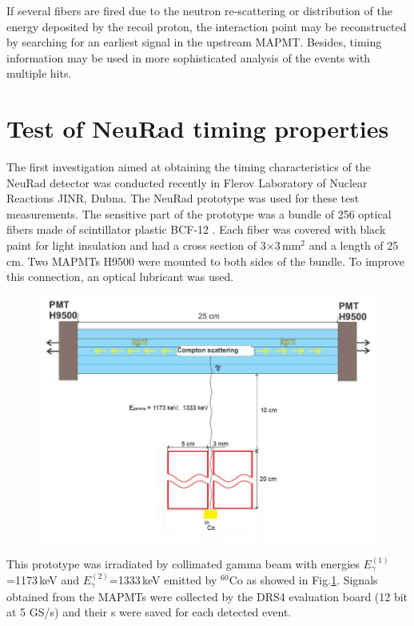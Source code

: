 \documentclass{webofc}
\begin{document}
If several  fibers are fired due to the neutron re-scattering or distribution of the energy deposited by the recoil proton, the interaction point may be reconstructed by searching for an earliest signal in the upstream MAPMT. Besides, timing information may be used in more sophisticated analysis of the events with multiple hits.

\section{Test of NeuRad timing properties}

The first investigation aimed at obtaining the timing characteristics of the NeuRad detector was conducted recently in Flerov Laboratory of Nuclear Reactions JINR, Dubna. The NeuRad prototype was used for these test measurements. The sensitive part of the prototype was a bundle of 256 optical fibers made of scintillator plastic BCF-12 \cite{crystals}. 
Each fiber was covered with black paint for light insulation and had a cross section of 3$\times$3\,mm$^2$ and a length of 25\,cm. Two MAPMTs H9500 \cite{hm} were mounted to both sides of the bundle. To improve this connection, an optical lubricant was used.

\begin{figure}[h]
	\centering
	\includegraphics[width=0.7\linewidth]{NeuRadexperiment.png}
	\label{ris:neuradexp}
\end{figure}

This prototype was irradiated by collimated gamma beam with energies $E^{(1)}_{\gamma}$=1173\,keV and $E^{(2)}_{\gamma}$=1333\,keV emitted by $^{60}$Co as showed in Fig.\ref{ris:neuradexp}. Signals obtained from the MAPMTs were collected by the DRS4 evaluation board (12 bit at 5 GS/s) and their s were saved for each detected event.
\end{document}
